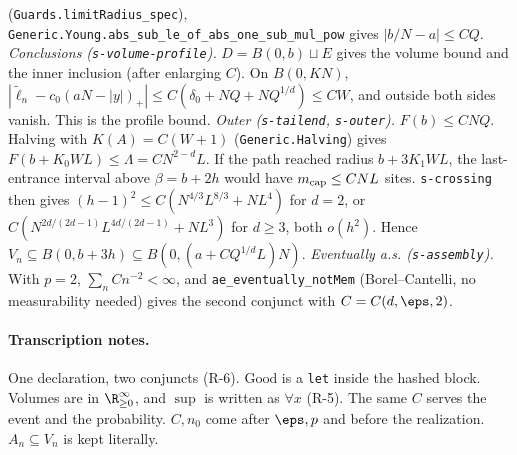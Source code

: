 (\texttt{Guards.limitRadius\_spec}), \texttt{Generic.Young.abs\_sub\_le\_of\_abs\_one\_sub\_mul\_pow}
gives $|b/N-a|\le CQ$.
\emph{Conclusions (\texttt{s-volume-profile}).} $D=B(0,b)\sqcup E$ gives the volume bound and the
inner inclusion (after enlarging $C$). On $B(0,KN)$,
$|\widetilde\ell_n-c_0(aN-|y|)_+|\le C(\delta_0+NQ+NQ^{1/d})\le CW$, and outside both sides vanish.
This is the profile bound.
\emph{Outer (\texttt{s-tailend}, \texttt{s-outer}).} $F(b)\le CNQ$. Halving with $K(A)=C(W+1)$
(\texttt{Generic.Halving}) gives $F(b+K_0WL)\le\Lambda=CN^{2-d}L$. If the path reached radius
$b+3K_1WL$, the last-entrance interval above $\beta=b+2h$ would have $m_{\rm cap}\le CNL$ sites.
\texttt{s-crossing} then gives $(h-1)^2\le C(N^{4/3}L^{8/3}+NL^4)$ for $d=2$, or
$C(N^{2d/(2d-1)}L^{4d/(2d-1)}+NL^3)$ for $d\ge3$, both $o(h^2)$. Hence
$V_n\subseteq B(0,b+3h)\subseteq B(0,(a+CQ^{1/d}L)N)$.
\emph{Eventually a.s. (\texttt{s-assembly}).} With $p=2$, $\sum_nCn^{-2}<\infty$, and
\texttt{ae\_eventually\_notMem} (Borel--Cantelli, no measurability needed) gives the second conjunct
with $C=C(d,\eps,2)$.
\paragraph{Transcription notes.} One declaration, two conjuncts (R-6). $\mathrm{Good}$ is a
\texttt{let} inside the hashed block. Volumes are in $\R_{\ge0}^\infty$, and $\sup$ is written as
$\forall x$ (R-5). The same $C$ serves the event and the probability. $C,n_0$ come after $\eps,p$
and before the realization. $A_n\subseteq V_n$ is kept literally.
